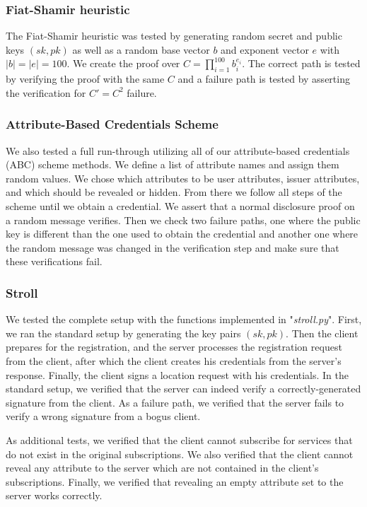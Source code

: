 \documentclass[9pt,conference]{IEEEtran}
\begin{document}
\subsubsection{Fiat-Shamir heuristic}
The Fiat-Shamir heuristic was tested by generating random secret and public keys $(sk, pk)$ as well as a random base vector $b$ and exponent vector $e$ with $|b| = |e| = 100$. We create the proof over ${C = \prod_{i=1}^{100}b_i ^{e_i}}$. The correct path is tested by verifying the proof with the same $C$ and a failure path is tested by asserting the verification for $C' = C^2$ failure.

\subsubsection{Attribute-Based Credentials Scheme}
We also tested a full run-through utilizing all of our attribute-based credentials (ABC) scheme methods. We define a list of attribute names and assign them random values. We chose which attributes to be user attributes, issuer attributes, and which should be revealed or hidden. From there we follow all steps of the scheme until we obtain a credential. We assert that a normal disclosure proof on a random message verifies. Then we check two failure paths, one where the public key is different than the one used to obtain the credential and another one where the random message was changed in the verification step and make sure that these verifications fail.

\subsubsection{Stroll}
We tested the complete setup with the functions implemented in "\textit{stroll.py}". First, we ran the standard setup by generating the key pairs $(sk, pk)$. Then the client prepares for the registration, and the server processes the registration request from the client, after which the client creates his credentials from the server's response. Finally, the client signs a location request with his credentials. In the standard setup, we verified that the server can indeed verify a correctly-generated signature from the client. As a failure path, we verified that the server fails to verify a wrong signature from a bogus client.

As additional tests, we verified that the client cannot subscribe for services that do not exist in the original subscriptions. We also verified that the client cannot reveal any attribute to the server which are not contained in the client's subscriptions. Finally, we verified that revealing an empty attribute set to the server works correctly.
\end{document}
